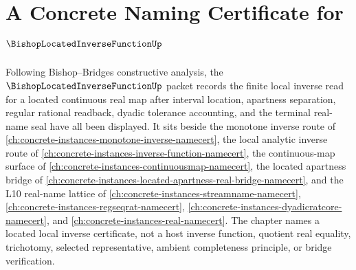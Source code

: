 \chapter{A Concrete Naming Certificate for $\BishopLocatedInverseFunctionUp$}
\label{ch:concrete-instances-bishop-located-inverse-function-namecert}

Following Bishop--Bridges constructive analysis, the $\BishopLocatedInverseFunctionUp$ packet records the finite local inverse read for a located continuous real map after interval location, apartness separation, regular rational readback, dyadic tolerance accounting, and the terminal real-name seal have all been displayed. It sits beside the monotone inverse route of \autoref{ch:concrete-instances-monotone-inverse-namecert}, the local analytic inverse route of \autoref{ch:concrete-instances-inverse-function-namecert}, the continuous-map surface of \autoref{ch:concrete-instances-continuousmap-namecert}, the located apartness bridge of \autoref{ch:concrete-instances-located-apartness-real-bridge-namecert}, and the L10 real-name lattice of \autoref{ch:concrete-instances-streamname-namecert}, \autoref{ch:concrete-instances-regseqrat-namecert}, \autoref{ch:concrete-instances-dyadicratcore-namecert}, and \autoref{ch:concrete-instances-real-namecert}. The chapter names a located local inverse certificate, not a host inverse function, quotient real equality, trichotomy, selected representative, ambient completeness principle, or bridge verification.

